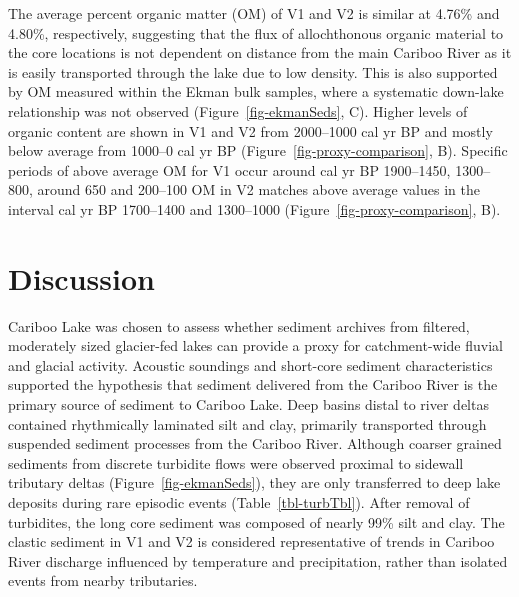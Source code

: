 \documentclass[
  letterpaper,
  DIV=11,
  numbers=noendperiod]{scrartcl}
\begin{document}
The average percent organic matter (OM) of V1 and V2 is similar at
4.76\% and 4.80\%, respectively, suggesting that the flux of
allochthonous organic material to the core locations is not dependent on
distance from the main Cariboo River as it is easily transported through
the lake due to low density. This is also supported by OM measured
within the Ekman bulk samples, where a systematic down-lake relationship
was not observed (Figure~\ref{fig-ekmanSeds}, C). Higher levels of
organic content are shown in V1 and V2 from 2000--1000 cal yr BP and
mostly below average from 1000--0 cal yr BP
(Figure~\ref{fig-proxy-comparison}, B). Specific periods of above
average OM for V1 occur around cal yr BP 1900--1450, 1300--800, around
650 and 200--100 OM in V2 matches above average values in the interval
cal yr BP 1700--1400 and 1300--1000 (Figure~\ref{fig-proxy-comparison},
B).

\hypertarget{discussion}{%
\section{Discussion}\label{discussion}}

Cariboo Lake was chosen to assess whether sediment archives from
filtered, moderately sized glacier-fed lakes can provide a proxy for
catchment-wide fluvial and glacial activity. Acoustic soundings and
short-core sediment characteristics supported the hypothesis that
sediment delivered from the Cariboo River is the primary source of
sediment to Cariboo Lake. Deep basins distal to river deltas contained
rhythmically laminated silt and clay, primarily transported through
suspended sediment processes from the Cariboo River. Although coarser
grained sediments from discrete turbidite flows were observed proximal
to sidewall tributary deltas (Figure~\ref{fig-ekmanSeds}), they are only
transferred to deep lake deposits during rare episodic events
(Table~\ref{tbl-turbTbl}). After removal of turbidites, the long core
sediment was composed of nearly 99\% silt and clay. The clastic sediment
in V1 and V2 is considered representative of trends in Cariboo River
discharge influenced by temperature and precipitation, rather than
isolated events from nearby tributaries.
\end{document}
